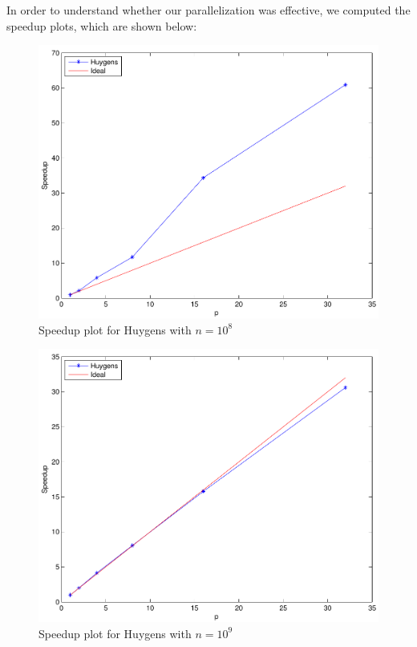 \documentclass[a4paper,11pt]{article}
\begin{document}
In order to understand whether our parallelization was effective, we computed the speedup plots, which are shown below:

\begin{figure}[H]
\begin{center}
\includegraphics[scale=0.6]{img/sp1e8}
\end{center}
\caption{Speedup plot for Huygens with $n=10^8$} \label{mb:2}
\end{figure}

\begin{figure}[H]
\begin{center}
\includegraphics[scale=0.6]{img/sp1e9}
\end{center}
\caption{Speedup plot for Huygens with $n=10^9$} \label{mb:2}
\end{figure}
\end{document}
